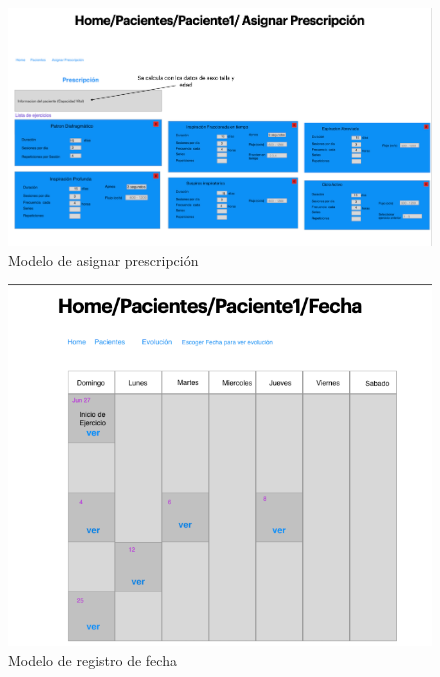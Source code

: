 \documentclass[12pt]{article}
\begin{document}
\begin{figure}[ht]
\centering
\includegraphics[scale=0.4]{imag/P7.png}
\caption{Modelo de asignar prescripción }
\label{6}
\end{figure}
\FloatBarrier


\begin{figure}[ht]
\centering
\includegraphics[scale=0.35]{imag/P8.png}
\caption{Modelo de registro de fecha }
\label{6}
\end{figure}
\FloatBarrier
\end{document}
